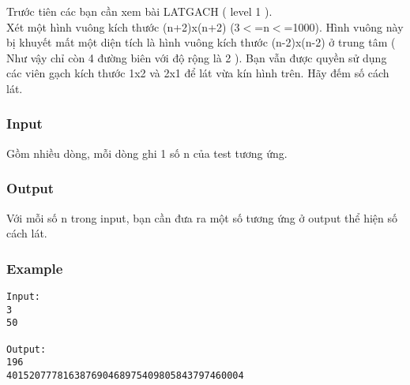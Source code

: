 



   Trước tiên các bạn cần xem bài LATGACH ( level 1 ).   
\\   Xét một hình vuông kích thước (n+2)x(n+2) (3$<$=n$<$=1000). Hình vuông này bị khuyết mất một diện tích là hình vuông kích thước (n-2)x(n-2) ở trung tâm ( Như vậy chỉ còn 4 đường biên với độ rộng là 2 ). Bạn vẫn được quyền sử dụng các viên gạch kích thước 1x2 và 2x1 để lát vừa kín hình trên. Hãy đếm số cách lát.  

\subsubsection{   Input  }

   Gồm nhiều dòng, mỗi dòng ghi 1 số n của test tương ứng.  

\subsubsection{   Output  }

   Với mỗi số n trong input, bạn cần đưa ra một số tương ứng ở output thể hiện số cách lát.  

\subsubsection{   Example  }
\begin{verbatim}
Input:
3
50

Output:
196
401520777816387690468975409805843797460004
\end{verbatim}